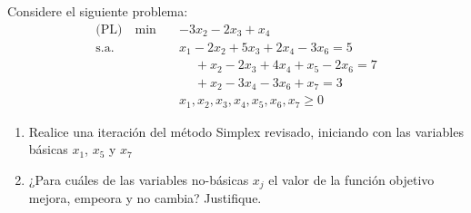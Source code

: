 Considere el siguiente problema:
\begin{align*}
\text{(PL)} \quad \min \quad & -3x_2 - 2x_3 + x_4 \\
\text{s.a.} \quad 
& x_1 - 2x_2 + 5x_3 + 2x_4 - 3x_6 = 5 \\
& \phantom{x_1\ } + x_2 - 2x_3 + 4x_4 + x_5 - 2x_6 = 7 \\
& \phantom{x_1\ } + x_2 - 3x_4 - 3x_6 + x_7 = 3 \\
& x_1, x_2, x_3, x_4, x_5, x_6, x_7 \geq 0
\end{align*}
             
\begin{enumerate}
    \item Realice una iteración del método Simplex revisado, iniciando con las variables básicas $x_1$, $x_5$ y $x_7$
    \item ¿Para cuáles de las variables no-básicas $x_j$ el valor de la función objetivo mejora, empeora y no cambia? Justifique.
\end{enumerate}

